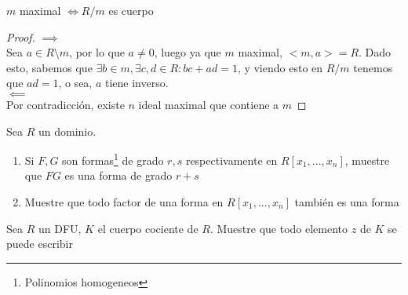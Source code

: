 \begin{thm}
    $m$ maximal $\iff R/m$  es cuerpo
\end{thm}
\begin{proof}
    $\implies$\\
    Sea $a\in R\setminus m$, por lo que $a\neq0$, luego ya que $m$ maximal, $<m, a>=R$. Dado esto, sabemos que $\exists b\in m, \exists c,d\in R: bc+ad=1$, y viendo esto en $R/m$ tenemos que $ad=1$, o sea, $a$ tiene inverso.\\
    $\impliedby$\\
    Por contradicción, existe $n$ ideal maximal que contiene a $m$
\end{proof}

\begin{prob}
    Sea $R$ un dominio.
    \begin{enumerate}
        \item Si $F,G$ son formas\footnote{Polinomios homogeneos} de grado $r,s$ respectivamente en $R[x_1,...,x_n]$, muestre que $FG$ es una forma de grado $r+s$
        \item Muestre que todo factor de una forma en $R[x_1,...,x_n]$ también es una forma
    \end{enumerate}
\end{prob}

\begin{prob}
    Sea $R$ un DFU, $K$ el cuerpo cociente de $R$. Muestre que todo elemento $z$ de $K$ se puede escribir
\end{prob}

